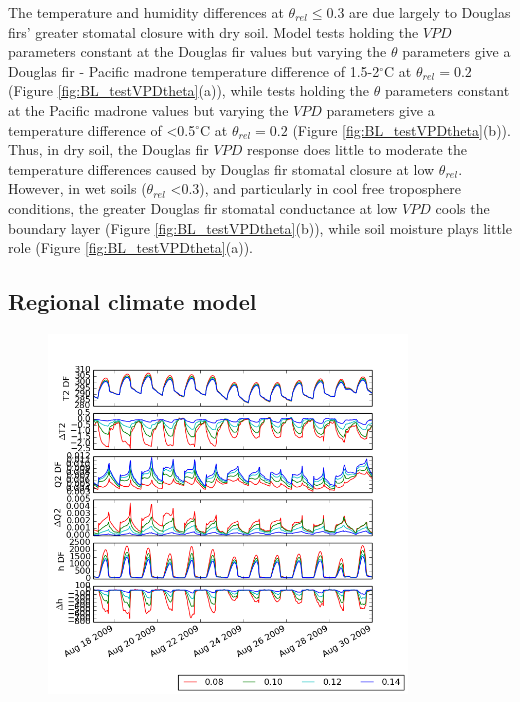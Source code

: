 The temperature and humidity differences at $\theta_{rel} \le 0.3$ are due largely to Douglas firs' greater stomatal closure with dry soil.  Model tests holding the $VPD$ parameters constant at the Douglas fir values but varying the $\theta$ parameters give a Douglas fir - Pacific madrone temperature difference of 1.5-2$^\circ$C at $\theta_{rel} = 0.2$ (Figure \ref{fig:BL_testVPDtheta}(a)), while tests holding the $\theta$ parameters constant at the Pacific madrone values but varying the $VPD$ parameters give a temperature difference of \textless 0.5$^\circ$C at $\theta_{rel} = 0.2$ (Figure \ref{fig:BL_testVPDtheta}(b)).  Thus, in dry soil, the Douglas fir $VPD$ response does little to moderate the temperature differences caused by Douglas fir stomatal closure at low $\theta_{rel}$.  However, in wet soils ($\theta_{rel}$ \textless $0.3$), and particularly in cool free troposphere conditions, the greater Douglas fir stomatal conductance at low $VPD$ cools the boundary layer (Figure \ref{fig:BL_testVPDtheta}(b)), while soil moisture plays little role (Figure \ref{fig:BL_testVPDtheta}(a)).


\subsection{Regional climate model}

\begin{figure}[here]
\includegraphics[width=0.85\textwidth]{ch2-BL/figures/T_Q_h_d02.png}
\caption{}
\label{fig:BL_WRFtseries}
\end{figure}

